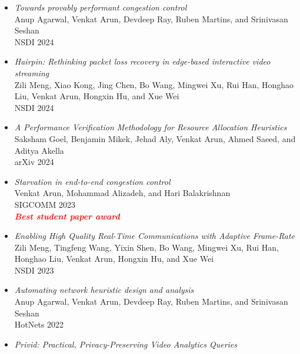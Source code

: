 \documentclass[notitlepage]{article}
\newcommand{\highlight}[1]{\textcolor{red}{\textit{\textbf{#1}}}}
\begin{document}
\begin{itemize}[noitemsep,nolistsep]
      HotNets 2024\\
              \item {\it Towards provably performant congestion control}\label{paper:ccmatic}\\
      Anup Agarwal, Venkat Arun, Devdeep Ray, Ruben Martins, and Srinivasan Seshan\\
      NSDI 2024\\
              \item {\it Hairpin: Rethinking packet loss recovery in edge-based interactive video streaming}\label{paper:hairpin}\\
      Zili Meng, Xiao Kong, Jing Chen, Bo Wang, Mingwei Xu, Rui Han, Honghao Liu, Venkat Arun, Hongxin Hu, and Xue Wei\\
      NSDI 2024\\
              \item {\it A Performance Verification Methodology for Resource Allocation Heuristics}\label{paper:perf_verif}\\
      Saksham Goel, Benjamin Mikek, Jehad Aly, Venkat Arun, Ahmed Saeed, and Aditya Akella\\
      arXiv 2024\\
              \item {\it Starvation in end-to-end congestion control}\label{paper:starvation}\\
      Venkat Arun, Mohammad Alizadeh, and Hari Balakrishnan\\
      SIGCOMM 2023\\
              \highlight{Best student paper award}\\
              \item {\it Enabling High Quality Real-Time Communications with Adaptive Frame-Rate}\label{paper:afr}\\
      Zili Meng, Tingfeng Wang, Yixin Shen, Bo Wang, Mingwei Xu, Rui Han, Honghao Liu, Venkat Arun, Hongxin Hu, and Xue Wei\\
      NSDI 2023\\
              \item {\it Automating network heuristic design and analysis}\label{paper:ccmatic_hotnets}\\
      Anup Agarwal, Venkat Arun, Devdeep Ray, Ruben Martins, and Srinivasan Seshan\\
      HotNets 2022\\
              \item {\it Privid: Practical, Privacy-Preserving Video Analytics Queries}\label{paper:privid}\\

\end{itemize}
\end{document}
